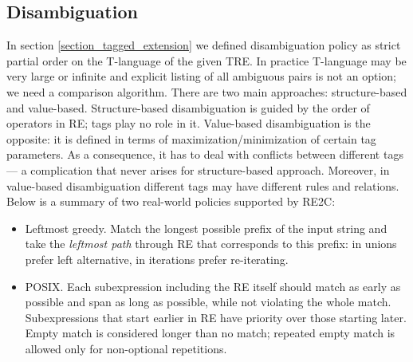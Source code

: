 \documentclass{article}
\theoremstyle{definition}
\begin{document}
\begin{multicols}{2}


\section{Disambiguation}\label{section_disambiguation}

In section \ref{section_tagged_extension} we defined disambiguation policy as strict partial order on the T-language of the given TRE.
In practice T-language may be very large or infinite
and explicit listing of all ambiguous pairs is not an option; we need a comparison algorithm.
There are two main approaches: structure-based and value-based.
Structure-based disambiguation is guided by the order of operators in RE; tags play no role in it.
Value-based disambiguation is the opposite: it is defined in terms of maximization/minimization of certain tag parameters.
As a consequence, it has to deal with conflicts between different tags ---
a complication that never arises for structure-based approach.
Moreover, in value-based disambiguation different tags may have different rules and relations.
Below is a summary of two real-world policies supported by RE2C:
\\

\begin{itemize}
    \setlength{\parskip}{0.5em}
    \item Leftmost greedy.
        Match the longest possible prefix of the input string
        and take the \emph{leftmost path} through RE that corresponds to this prefix:
        in unions prefer left alternative, in iterations prefer re-iterating.

    \item POSIX.
        Each subexpression including the RE itself should match as early as possible
        and span as long as possible, while not violating the whole match.
        Subexpressions that start earlier in RE have priority over those starting later.
        Empty match is considered longer than no match;
        repeated empty match is allowed only for non-optional repetitions.
    \\
\end{itemize}


\end{multicols}
\end{document}
